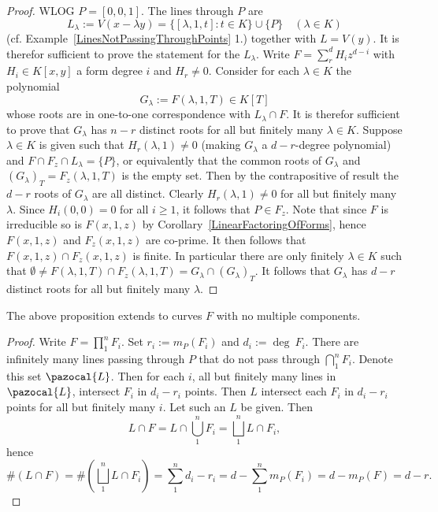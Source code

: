      \begin{proof}
         WLOG $P=[0,0,1]$. The lines through $P$ are 
         $$L_\lambda := V(x-\lambda y)= \{[\lambda, 1, t] : t\in K\}\cup \{P\} \quad (\lambda\in K)$$
         (cf. Example~\ref{LinesNotPassingThroughPoints} 1.)
         together with $L = V(y)$. It is therefor sufficient to prove the statement for the $L_\lambda$. Write $F=\sum_r^d H_iz^{d-i}$ with $H_i\in K[x,y]$ a form degree $i$ and $H_r\neq 0$. Consider for each $\lambda \in K$ the polynomial 
         $$G_\lambda := F(\lambda,1,T)\in K[T]$$
         whose roots are in one-to-one correspondence with $L_\lambda \cap F$. It is therefor sufficient to prove that $G_\lambda$ has $n-r$ distinct roots for all but finitely many $\lambda \in K$. Suppose $\lambda\in K$ is given such that $H_r(\lambda,1)\neq 0$ (making $G_\lambda$ a $d-r$-degree polynomial) and $F\cap F_z \cap L_\lambda = \{P\}$, or equivalently that the common roots of $G_\lambda$ and $(G_\lambda)_T=F_z(\lambda,1,T)$ is the empty set. Then by the contrapositive of {\Large result} the $d-r$ roots of $G_\lambda$ are all distinct. Clearly $H_r(\lambda,1)\neq 0$ for all but finitely many $\lambda$. Since $H_i(0,0)=0$ for all $i\geq 1$, it follows that $P \in F_z$. Note that since $F$ is irreducible so is $F(x,1,z)$ by Corollary~\ref{LinearFactoringOfForms}, hence $F(x,1,z)$ and $F_z(x,1,z)$ are co-prime. It then follows that $F(x,1,z)\cap F_z(x,1,z)$ is finite. In particular there are only finitely $\lambda\in K$ such that $\emptyset \neq F(\lambda,1,T) \cap F_z(\lambda,1,T) = G_\lambda \cap (G_\lambda)_T$. It follows that $G_\lambda $ has $d-r$ distinct roots for all but finitely many $\lambda$.
     \end{proof}
     \begin{proposition}
         The above proposition extends to curves $F$ with no multiple components.
     \end{proposition}
     \begin{proof}
         Write $F=\prod_1^n F_i$. Set $r_i := m_P(F_i)$ and $d_i:= \deg \ F_i$. There are infinitely many lines passing through $P$ that do not pass through $\bigcap_1^n F_i$. Denote this set $\pazocal{L}$. Then for each $i$, all but finitely many lines in $\pazocal{L}$, intersect $F_i$ in $d_i-r_i$ points. Then $L$ intersect each $F_i$ in $d_i-r_i$ points for all but finitely many $i$. Let such an $L$ be given. Then  
         $$L\cap F = L \cap \bigcup_1^n F_i = \bigsqcup_1^n L\cap F_i,$$
         hence 
         $$\#(L\cap F) = \#\left(\bigsqcup_1^n L\cap F_i\right) = \sum_1^n d_i-r_i= d -\sum_1^n m_P(F_i)=d-m_P(F)=d-r.$$
    \end{proof}
